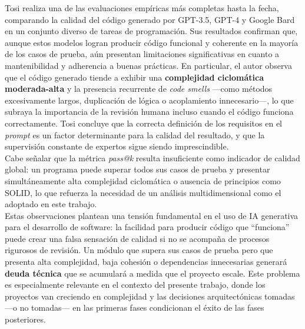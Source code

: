 Tosi \cite{Tosi:2024:CodeQuality} realiza una de las evaluaciones empíricas más completas hasta la fecha, comparando la calidad del código generado por GPT-3.5, GPT-4 y Google Bard en un conjunto diverso de tareas de programación. Sus resultados confirman que, aunque estos modelos logran producir código funcional y coherente en la mayoría de los casos de prueba, aún presentan limitaciones significativas en cuanto a mantenibilidad y adherencia a buenas prácticas. En particular, el autor observa que el código generado tiende a exhibir una \textbf{complejidad ciclomática moderada-alta} y la presencia recurrente de \textit{code smells} ---como métodos excesivamente largos, duplicación de lógica o acoplamiento innecesario---, lo que subraya la importancia de la revisión humana incluso cuando el código funciona correctamente. Tosi concluye que la correcta definición de los requisitos en el \textit{prompt} es un factor determinante para la calidad del resultado, y que la supervisión constante de expertos sigue siendo imprescindible.\\

Cabe señalar que la métrica \textit{pass@k} \cite{Chen:2021:Codex} resulta insuficiente como indicador de calidad global: un programa puede superar todos sus casos de prueba y presentar simultáneamente alta complejidad ciclomática o ausencia de principios como \ac{SOLID}, lo que refuerza la necesidad de un análisis multidimensional como el adoptado en este trabajo.\\

Estas observaciones plantean una tensión fundamental en el uso de \ac{IA} generativa para el desarrollo de software: la facilidad para producir código que ``funciona'' puede crear una falsa sensación de calidad si no se acompaña de procesos rigurosos de revisión. Un módulo que supera sus casos de prueba pero que presenta alta complejidad, baja cohesión o dependencias innecesarias generará \textbf{deuda técnica} que se acumulará a medida que el proyecto escale. Este problema es especialmente relevante en el contexto del presente trabajo, donde los proyectos van creciendo en complejidad y las decisiones arquitectónicas tomadas ---o no tomadas--- en las primeras fases condicionan el éxito de las fases posteriores.\\

